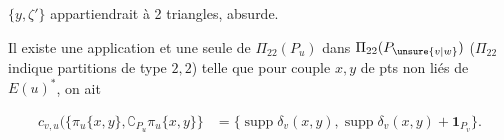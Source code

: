 
$\{y,\zeta'\}$ appartiendrait à 2 triangles, absurde.

 Il existe une application  et une seule de $\Pi_{22}(P_u)$ dans $\Pi_{22}(P_{\unsure{v|w}})$ ($\Pi_{22}$ indique partitions de type $2,2$) telle que pour    couple $x,y$ de pts non liés de $E(u)^*$,  on ait


\[
\begin{aligned}
c_{v,u}(\{\pi_u\{x,y\},\complement_{P_u}\pi_u\{x,y\}\}
&=\{\operatorname{supp}\delta_v(x,y),\operatorname{supp}\delta_v(x,y)+\mathbf{1}_{P_v}\}.
\end{aligned}
\]
